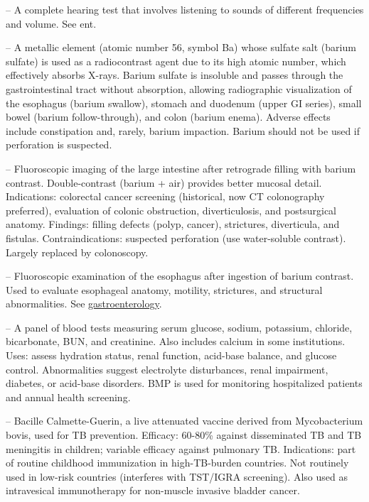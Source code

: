 -- A complete hearing test that involves listening to sounds of different frequencies and volume. See ent.

-- A metallic element (atomic number 56, symbol Ba) whose sulfate salt (barium sulfate) is used as a radiocontrast agent due to its high atomic number, which effectively absorbs X-rays. Barium sulfate is insoluble and passes through the gastrointestinal tract without absorption, allowing radiographic visualization of the esophagus (barium swallow), stomach and duodenum (upper GI series), small bowel (barium follow-through), and colon (barium enema). Adverse effects include constipation and, rarely, barium impaction. Barium should not be used if perforation is suspected.

-- Fluoroscopic imaging of the large intestine after retrograde filling with barium contrast. Double-contrast (barium + air) provides better mucosal detail. Indications: colorectal cancer screening (historical, now CT colonography preferred), evaluation of colonic obstruction, diverticulosis, and postsurgical anatomy. Findings: filling defects (polyp, cancer), strictures, diverticula, and fistulas. Contraindications: suspected perforation (use water-soluble contrast). Largely replaced by colonoscopy.

-- Fluoroscopic examination of the esophagus after ingestion of barium contrast. Used to evaluate esophageal anatomy, motility, strictures, and structural abnormalities. See \hyperlink{Gastroenterology}{gastroenterology}.

-- A panel of blood tests measuring serum glucose, sodium, potassium, chloride, bicarbonate, BUN, and creatinine. Also includes calcium in some institutions. Uses: assess hydration status, renal function, acid-base balance, and glucose control. Abnormalities suggest electrolyte disturbances, renal impairment, diabetes, or acid-base disorders. BMP is used for monitoring hospitalized patients and annual health screening.

-- Bacille Calmette-Guerin, a live attenuated vaccine derived from Mycobacterium bovis, used for TB prevention. Efficacy: 60-80\% against disseminated TB and TB meningitis in children; variable efficacy against pulmonary TB. Indications: part of routine childhood immunization in high-TB-burden countries. Not routinely used in low-risk countries (interferes with TST/IGRA screening). Also used as intravesical immunotherapy for non-muscle invasive bladder cancer.

